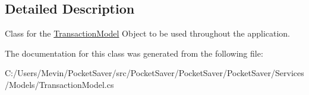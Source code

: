 \subsection{Detailed Description}
Class for the \hyperlink{class_pocket_saver_1_1_models_1_1_transaction_model}{Transaction\+Model} Object to be used throughout the application. 



The documentation for this class was generated from the following file\+:\begin{DoxyCompactItemize}
\item 
C\+:/\+Users/\+Mevin/\+Pocket\+Saver/src/\+Pocket\+Saver/\+Pocket\+Saver/\+Pocket\+Saver/\+Services/\+Models/Transaction\+Model.\+cs\end{DoxyCompactItemize}
